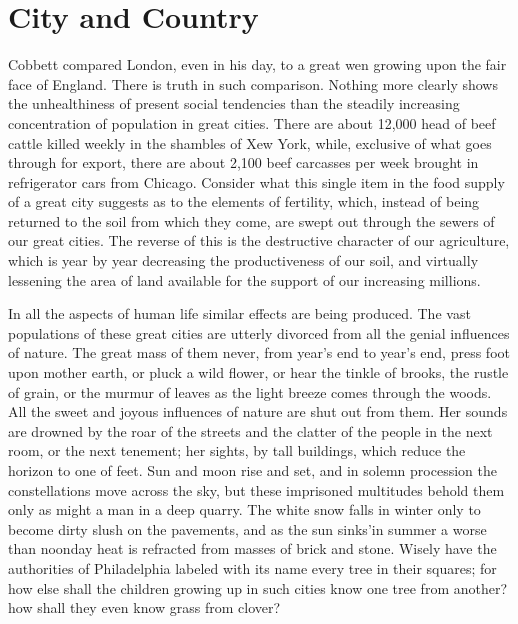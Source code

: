 \documentclass{book}
\begin{document}
{}\chapter{City and Country}
\label{chapter-21}
Cobbett compared London, even in his day, to a great wen growing upon the fair face of England. There is truth in such comparison. Nothing more clearly shows the unhealthiness of present social tendencies than the steadily increasing concentration of population in great cities. There are about 12,000 head of beef cattle killed weekly in the shambles of Xew York, while, exclusive of what goes through for export, there are about 2,100 beef carcasses per week brought in refrigerator cars from Chicago. Consider what this single item in the food supply of a great city suggests as to the elements of fertility, which, instead of being returned to the soil from which they come, are swept out through the sewers of our great cities. The reverse of this is the destructive character of our agriculture, which is year by year decreasing the productiveness of our soil, and virtually lessening the area of land available for the support of our increasing millions.

In all the aspects of human life similar effects are being produced. The vast populations of these great cities are utterly divorced from all the genial influences of nature. The great mass of them never, from year’s end to year’s end, press foot upon mother earth, or pluck a wild flower, or hear the tinkle of brooks, the rustle of grain, or the murmur of leaves as the light breeze comes through the woods. All the sweet and joyous influences of nature are shut out from them. Her sounds are drowned by the roar of the streets and the clatter of the people in the next room, or the next tenement; her sights, by tall buildings, which reduce the horizon to one of feet. Sun and moon rise and set, and in solemn procession the constellations move across the sky, but these imprisoned multitudes behold them only as might a man in a deep quarry. The white snow falls in winter only to become dirty slush on the pavements, and as the sun sinks’in summer a worse than noonday heat is refracted from masses of brick and stone. Wisely have the authorities of Philadelphia labeled with its name every tree in their squares; for how else shall the children growing up in such cities know one tree from another? how shall they even know grass from clover?
\end{document}
